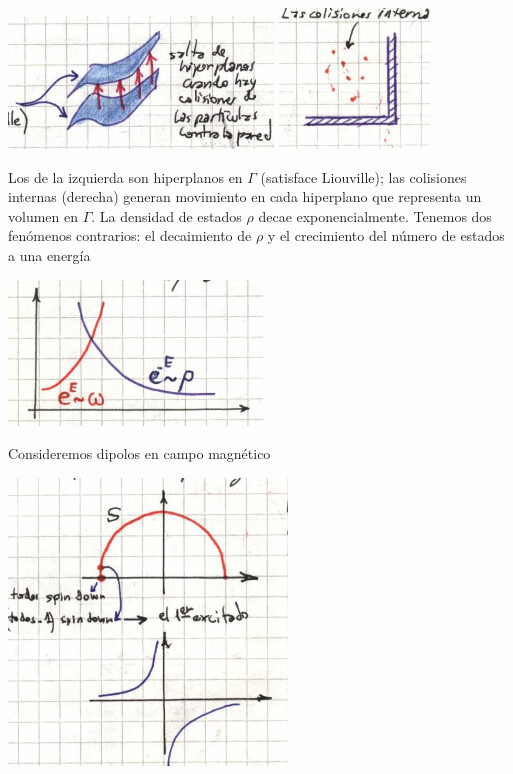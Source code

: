 \documentclass[10pt,oneside]{CBFT_book}
\begin{document}
\includegraphics[scale=0.5]{images/1606329307.jpg} 
\includegraphics[scale=0.5]{images/1606329311.jpg}

Los de la izquierda son hiperplanos en $\Gamma$ (satisface Liouville); las colisiones internas (derecha)
generan movimiento en cada hiperplano que representa un volumen en $\Gamma$.
La densidad de estados $\rho$ decae exponencialmente. Tenemos dos fenómenos contrarios:
el decaimiento de $\rho$ y el crecimiento del número de estados a una energía

\includegraphics[scale=0.5]{images/1606329317.jpg}

Consideremos dipolos en campo magnético

\includegraphics[scale=0.5]{images/1606329322.jpg}
\end{document}

